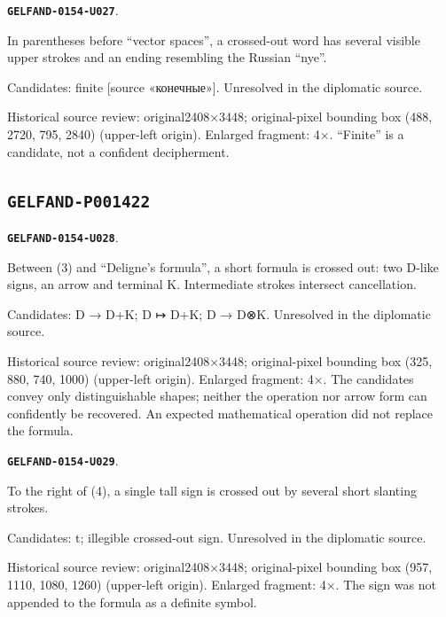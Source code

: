 \documentclass[11pt]{article}
\theoremstyle{definition}
\theoremstyle{remark}
\begin{document}
\par\noindent\leavevmode{}\label{GELFAND-0154-U027}\label{GELFAND-P001421:before-vector-spaces-cancelled:note}\textbf{\texttt{GELFAND-0154-U027}}.\nopagebreak[4]\par
In parentheses before “vector spaces”, a crossed-out word has several visible upper strokes and an ending resembling the Russian “nye”.\par
Candidates: finite [source «конечные»]. Unresolved in the diplomatic source.\par
Historical source review: original2408×3448; original-pixel bounding box (488, 2720, 795, 2840) (upper-left origin). Enlarged fragment: 4×. “Finite” is a candidate, not a confident decipherment.\par\medskip
\subsection*{\texttt{GELFAND-P001422}}
\par\noindent\leavevmode{}\label{GELFAND-0154-U028}\label{GELFAND-P001422:cancelled-divisor-map:note}\textbf{\texttt{GELFAND-0154-U028}}.\nopagebreak[4]\par
Between (3) and “Deligne’s formula”, a short formula is crossed out: two D-like signs, an arrow and terminal K. Intermediate strokes intersect cancellation.\par
Candidates: D → D+K; D ↦ D+K; D → D⊗K. Unresolved in the diplomatic source.\par
Historical source review: original2408×3448; original-pixel bounding box (325, 880, 740, 1000) (upper-left origin). Enlarged fragment: 4×. The candidates convey only distinguishable shapes; neither the operation nor arrow form can confidently be recovered. An expected mathematical operation did not replace the formula.\par\medskip
\par\noindent\leavevmode{}\label{GELFAND-0154-U029}\label{GELFAND-P001422:eq4-cancelled-sign:note}\textbf{\texttt{GELFAND-0154-U029}}.\nopagebreak[4]\par
To the right of (4), a single tall sign is crossed out by several short slanting strokes.\par
Candidates: t; illegible crossed-out sign. Unresolved in the diplomatic source.\par
Historical source review: original2408×3448; original-pixel bounding box (957, 1110, 1080, 1260) (upper-left origin). Enlarged fragment: 4×. The sign was not appended to the formula as a definite symbol.\par\medskip
\end{document}
